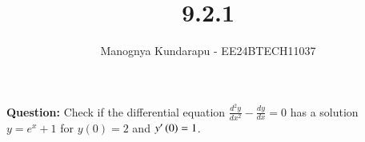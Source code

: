 \documentclass[journal]{IEEEtran}
\begin{document}

\vspace{3cm}

\title{9.2.1}
\author{Manognya Kundarapu - EE24BTECH11037
}
{\let\newpage\relax\maketitle}

\renewcommand{\thefigure}{\theenumi}
\renewcommand{\thetable}{\theenumi}
\setlength{\intextsep}{10pt} %


\renewcommand{\thetable}{\theenumi}
\textbf{Question:} Check if the differential equation $\frac{d^2y}{dx^2}-\frac{dy}{dx}=0$ has a solution $y=e^x+1$ for $y(0)=2$ and $y^\prime\left(0\right)=1$.
\end{document}
